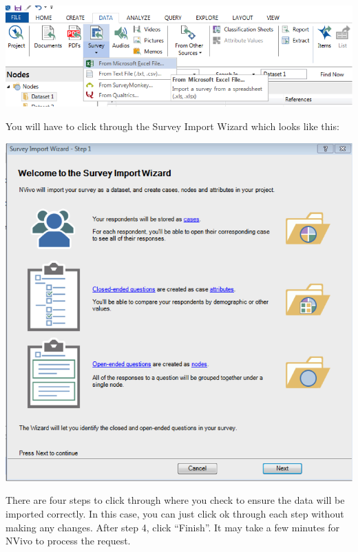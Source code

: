 \documentclass[]{book}
\theoremstyle{definition}
\theoremstyle{definition}
\theoremstyle{definition}
\theoremstyle{remark}
\begin{document}
\includegraphics{imgs/qual_35.png}

You will have to click through the Survey Import Wizard which looks like
this:

\includegraphics{imgs/qual_36.png}

There are four steps to click through where you check to ensure the data
will be imported correctly. In this case, you can just click ok through
each step without making any changes. After step 4, click ``Finish''. It
may take a few minutes for NVivo to process the request.
\end{document}
